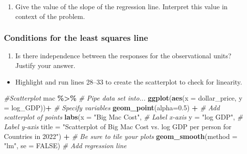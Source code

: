 \documentclass[
]{report}
\newenvironment{Shaded}{\begin{snugshade}}{\end{snugshade}}
\newcommand{\AttributeTok}[1]{\textcolor[rgb]{0.13,0.29,0.53}{#1}}
\newcommand{\CommentTok}[1]{\textcolor[rgb]{0.56,0.35,0.01}{\textit{#1}}}
\newcommand{\ConstantTok}[1]{\textcolor[rgb]{0.56,0.35,0.01}{#1}}
\newcommand{\FloatTok}[1]{\textcolor[rgb]{0.00,0.00,0.81}{#1}}
\newcommand{\FunctionTok}[1]{\textcolor[rgb]{0.13,0.29,0.53}{\textbf{#1}}}
\newcommand{\NormalTok}[1]{#1}
\newcommand{\SpecialCharTok}[1]{\textcolor[rgb]{0.81,0.36,0.00}{\textbf{#1}}}
\newcommand{\StringTok}[1]{\textcolor[rgb]{0.31,0.60,0.02}{#1}}
\providecommand{\tightlist}{%
  \setlength{\itemsep}{0pt}\setlength{\parskip}{0pt}}
\begin{document}
\begin{enumerate}
\def\labelenumi{\arabic{enumi}.}
\setcounter{enumi}{3}
\tightlist
\item
  Give the value of the slope of the regression line. Interpret this value in context of the problem.
  \vspace{0.6in}
\end{enumerate}

\subsubsection*{Conditions for the least squares line}\label{conditions-for-the-least-squares-line-1}

\begin{enumerate}
\def\labelenumi{\arabic{enumi}.}
\setcounter{enumi}{4}
\tightlist
\item
  Is there independence between the responses for the observational units? Justify your answer.
\end{enumerate}

\vspace{0.3in}

\begin{itemize}
\tightlist
\item
  Highlight and run lines 28--33 to create the scatterplot to check for linearity.
\end{itemize}

\begin{Shaded}
\begin{Highlighting}[]
\CommentTok{\#Scatterplot}
\NormalTok{mac }\SpecialCharTok{\%\textgreater{}\%} \CommentTok{\# Pipe data set into...}
  \FunctionTok{ggplot}\NormalTok{(}\FunctionTok{aes}\NormalTok{(}\AttributeTok{x =}\NormalTok{ dollar\_price, }\AttributeTok{y =}\NormalTok{ log\_GDP))}\SpecialCharTok{+}  \CommentTok{\# Specify variables}
  \FunctionTok{geom\_point}\NormalTok{(}\AttributeTok{alpha=}\FloatTok{0.5}\NormalTok{) }\SpecialCharTok{+}  \CommentTok{\# Add scatterplot of points}
  \FunctionTok{labs}\NormalTok{(}\AttributeTok{x =} \StringTok{"Big Mac Cost"}\NormalTok{,  }\CommentTok{\# Label x{-}axis}
       \AttributeTok{y =} \StringTok{"log GDP"}\NormalTok{,  }\CommentTok{\# Label y{-}axis}
       \AttributeTok{title =} \StringTok{"Scatterplot of Big Mac Cost vs. log GDP per person}
\StringTok{       for Countries in 2022"}\NormalTok{) }\SpecialCharTok{+}  \CommentTok{\# Be sure to tile your plots}
  \FunctionTok{geom\_smooth}\NormalTok{(}\AttributeTok{method =} \StringTok{"lm"}\NormalTok{, }\AttributeTok{se =} \ConstantTok{FALSE}\NormalTok{)  }\CommentTok{\# Add regression line}
\end{Highlighting}
\end{Shaded}
\end{document}
